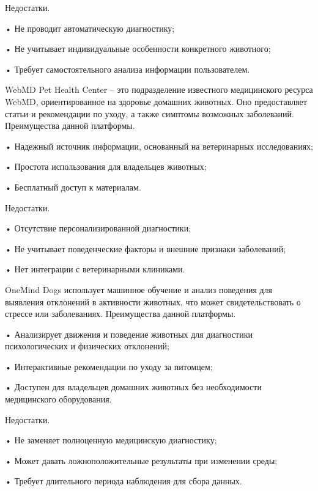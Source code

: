 {  \par \redline Недостатки.
  
  \par \redline • Не проводит автоматическую диагностику;
  \par \redline • Не учитывает индивидуальные особенности конкретного животного;
  \par \redline • Требует самостоятельного анализа информации пользователем.

  \par \redline WebMD Pet Health Center – это подразделение известного медицинского ресурса WebMD, ориентированное на здоровье домашних животных. Оно предоставляет статьи и рекомендации по уходу, а также симптомы возможных заболеваний. Преимущества данной платформы.
  
  \par \redline • Надежный источник информации, основанный на ветеринарных исследованиях;
  \par \redline • Простота использования для владельцев животных;
  \par \redline • Бесплатный доступ к материалам.

  \par \redline Недостатки.
  
  \par \redline • Отсутствие персонализированной диагностики;
  \par \redline • Не учитывает поведенческие факторы и внешние признаки заболеваний;
  \par \redline • Нет интеграции с ветеринарными клиниками.


  \par \redline OneMind Dogs использует машинное обучение и анализ поведения для выявления отклонений в активности животных, что может свидетельствовать о стрессе или заболеваниях. Преимущества данной платформы.
  
  \par \redline • Анализирует движения и поведение животных для диагностики психологических и физических отклонений;
  \par \redline • Интерактивные рекомендации по уходу за питомцем;
  \par \redline • Доступен для владельцев домашних животных без необходимости медицинского оборудования.

  \par \redline Недостатки.
  
  \par \redline • Не заменяет полноценную медицинскую диагностику;
  \par \redline • Может давать ложноположительные результаты при изменении среды;
  \par \redline • Требует длительного периода наблюдения для сбора данных.

}
